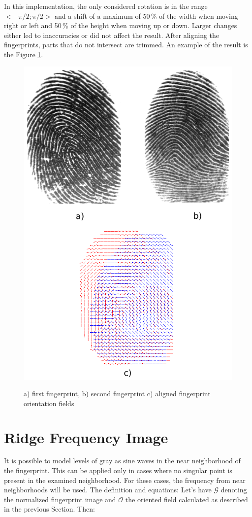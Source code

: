 In this implementation, the only considered rotation is in the range $ <-\pi/2; \pi/2> $ and a shift of a maximum of 50\,\% of the width when moving right or left and 50\,\% of the height when moving up or down. Larger changes either led to inaccuracies or did not affect the result. After aligning the fingerprints, parts that do not intersect are trimmed. An example of the result is the Figure \ref{fig:prunik}.
\begin{figure}[H]
    \centering
        {\includegraphics[width=0.5\linewidth]{obrazky-figures/prunik.png}}\\
        \caption{a) first fingerprint, b) second fingerprint c) aligned fingerprint orientation fields}
        \label{fig:prunik}
\end{figure}

\section{Ridge Frequency Image}
It is possible to model levels of gray as sine waves in the near neighborhood of the fingerprint. This can be applied only in cases where no singular point is present in the examined neighborhood. For these cases, the frequency from near neighborhoods will be used. The definition and equations:
Let's have $ \mathcal{G} $ denoting the normalized fingerprint image and $\mathcal{O}$ the oriented field calculated as described in the previous Section. Then: \cite{patriciu2014fingerprint}



